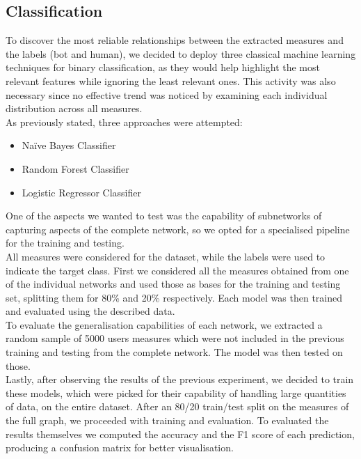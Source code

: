 \documentclass[12pt, a4paper]{article}
\begin{document}
    \subsection{Classification}
    	To discover the most reliable relationships between the extracted measures and the labels (bot and human), we decided to deploy three classical machine learning techniques for binary classification, as they would help highlight the most relevant features while ignoring the least relevant ones. This activity was also necessary since no effective trend was noticed by examining each individual distribution across all measures.\\
    	As previously stated, three approaches were attempted:
    	\begin{itemize}
        	\item Na\"ive Bayes Classifier
        	\item Random Forest Classifier
        	\item Logistic Regressor Classifier
    	\end{itemize}
    	One of the aspects we wanted to test was the capability of subnetworks of capturing aspects of the complete network, so we opted for a specialised pipeline for the training and testing.\\
    	All measures were considered for the dataset, while the labels were used to indicate the target class. First we considered all the measures obtained from one of the individual networks and used those as bases for the training and testing set, splitting them for 80\% and 20\% respectively. Each model was then trained and evaluated using the described data.\\
    	To evaluate the generalisation capabilities of each network, we extracted a random sample of 5000 users measures which were not included in the previous training and testing from the complete network. The model was then tested on those.\\
    	Lastly, after observing the results of the previous experiment, we decided to train these models, which were picked for their capability of handling large quantities of data, on the entire dataset. After an 80/20 train/test split on the measures of the full graph, we proceeded with training and evaluation.
    	To evaluated the results themselves we computed the accuracy and the F1 score of each prediction, producing a confusion matrix for better visualisation.
\end{document}
